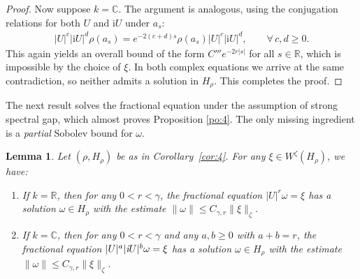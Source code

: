 \documentclass[11 pt]{amsart}
\newcommand{\RR}{\mathbb{R}}
\newcommand{\CC}{\mathbb{C}}
\newcommand{\norm}[1]{\lVert#1\rVert}
\newtheorem{lemma}[theorem]{Lemma}
\theoremstyle{definition}
\numberwithin{equation}{section}
\begin{document}
\begin{proof}
Now suppose $k=\CC$. The argument is analogous, using the conjugation relations
for both $U$ and $\mathrm{i}U$ under $a_s$:
\begin{align*}
|U|^{c}|\mathrm{i}U|^{d}\rho(a_s)=e^{-2(c+d)s}\rho(a_s)|U|^{c}|\mathrm{i}U|^{d},\qquad \forall\,c,d\geq0.
\end{align*}
This again yields an overall bound
  of the form $C'''e^{-2r|s|}$ for all $s\in\RR$, which is impossible
  by the choice of $\xi$. In both complex equations we arrive at the same contradiction, so neither admits
a solution in $H_\rho$. This completes the proof.


\end{proof}







The next result solves the fractional equation under the assumption of strong spectral gap,
which almost proves Proposition \ref{po:4}. The only missing ingredient is a
\emph{partial} Sobolev bound for $\omega$.
\begin{lemma}\label{le:23}
Let $(\rho,H_\rho)$ be as in Corollary~\ref{cor:4}. For any $\xi\in W^{\zeta}(H_\rho)$, we have:
\begin{enumerate}
  \item\label{for:248} If $k=\RR$, then for any $0<r<\gamma$, the fractional equation $|U|^r\omega=\xi$ has a solution $\omega\in H_\rho$ with the estimate $\norm{\omega}\leq C_{\gamma,r}\big\|\xi\big\|_{\zeta}$.

  \item\label{for:250} If $k=\CC$, then for any $0<r<\gamma$ and any $a,b\geq0$ with $a+b=r$, the fractional equation $|U|^{a}|\emph{i} U|^{b}\omega=\xi$
has a solution $\omega\in H_\rho$ with the estimate $\norm{\omega}\leq C_{\gamma,r}\big\|\xi\big\|_{\zeta}$.
\end{enumerate}

\end{lemma}
\end{document}
